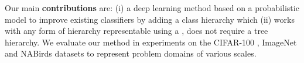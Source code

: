 \documentclass[10pt,twocolumn,letterpaper]{article}
\begin{document}


Our main \textbf{contributions} are: (i) a deep learning method based on a probabilistic model to improve existing classifiers by adding a
class hierarchy which (ii) works with any form of hierarchy representable using a
, \ie does not require a tree hierarchy. We evaluate our method in
experiments on the CIFAR-100 \cite{Krizhevsky2009CIFAR}, ImageNet and NABirds \cite{VanHorn2015NAB} datasets to represent problem
domains of various scales.


%
%
%
\end{document}
